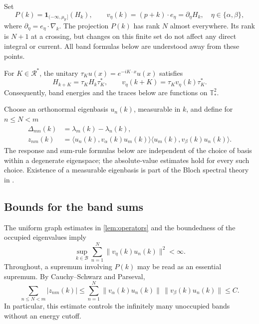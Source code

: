 \documentclass[11pt,a4paper]{article}
\newcommand{\B}{\mathcal B}
\newcommand{\lat}{\mathcal R}
\newcommand{\T}{\mathbb T_{\!*}^{2}}
\newcommand{\one}{\mathbf 1}
\newcommand{\ip}[2]{\langle #1,#2\rangle}
\newcommand{\norm}[1]{\lVert #1\rVert}
\numberwithin{equation}{section}
\begin{document}
Set
\begin{equation}\label{eq:projector-velocity}
 P(k)=\one_{(-\infty,\mu_{\mathrm F}]}(H_k),\qquad
 v_\eta(k)=(p+k)\cdot e_\eta=\partial_\eta H_k,
 \quad \eta\in\{\alpha,\beta\},
\end{equation}
where $\partial_\eta=e_\eta\cdot\nabla_k$. The projection $P(k)$ has
rank $N$ almost everywhere. Its rank is $N+1$ at a crossing, but changes
on this finite set do not affect any direct integral or current. All
band formulas below are understood away from these points.

For $K\in\lat^*$, the unitary $\tau_Ku(x)=e^{-iK\cdot x}u(x)$ satisfies
\[
 H_{k+K}=\tau_KH_k\tau_K^*,\qquad
 v_\eta(k+K)=\tau_Kv_\eta(k)\tau_K^*.
\]
Consequently, band energies and the traces below are functions on $\T$.

Choose an orthonormal eigenbasis $u_n(k)$, measurable in $k$, and define
for $n\leq N<m$
\begin{equation}\label{eq:gap-matrix}
 \begin{split}
 \Delta_{mn}(k)&=\lambda_m(k)-\lambda_n(k),\\
 z_{nm}(k)&=
 \ip{u_n(k)}{v_\alpha(k)u_m(k)}
 \ip{u_m(k)}{v_\beta(k)u_n(k)}.
 \end{split}
\end{equation}
The response and sum-rule formulas below are independent of the choice
of basis within a degenerate eigenspace; the absolute-value estimates
hold for every such choice. Existence of a measurable
eigenbasis is part of the Bloch spectral theory in
\cite[Theorem XIII.98]{RS4}.

\subsection{Bounds for the band sums}

The uniform graph estimates in \cref{lem:operators} and the boundedness
of the occupied eigenvalues imply
\begin{equation}\label{eq:occupied-bound}
 \sup_{k\in\B}\sum_{n=1}^N
 \norm{v_\eta(k)u_n(k)}^2<\infty.
\end{equation}
Throughout, a supremum involving $P(k)$ may be read as an essential
supremum. By Cauchy--Schwarz and Parseval,
\begin{equation}\label{eq:sum-bound}
 \sum_{n\leq N<m}|z_{nm}(k)|
 \leq\sum_{n=1}^N
 \norm{v_\alpha(k)u_n(k)}\,
 \norm{v_\beta(k)u_n(k)}\leq C.
\end{equation}
In particular, this estimate controls the infinitely many unoccupied
bands without an energy cutoff.
\end{document}
